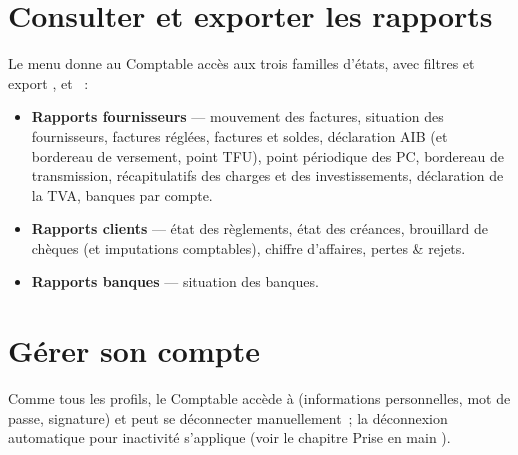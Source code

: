 \section{Consulter et exporter les rapports}

Le menu  donne au Comptable accès aux trois familles d'états, avec filtres et export ,  et ~:

\begin{itemize}
  \item \textbf{Rapports fournisseurs} — mouvement des factures, situation des fournisseurs, factures réglées, factures et soldes, déclaration AIB (et bordereau de versement, point TFU), point périodique des PC, bordereau de transmission, récapitulatifs des charges et des investissements, déclaration de la TVA, banques par compte.
  \item \textbf{Rapports clients} — état des règlements, état des créances, brouillard de chèques (et imputations comptables), chiffre d'affaires, pertes \& rejets.
  \item \textbf{Rapports banques} — situation des banques.
\end{itemize}


\section{Gérer son compte}

Comme tous les profils, le Comptable accède à  (informations personnelles, mot de passe, signature) et peut se déconnecter manuellement~; la déconnexion automatique pour inactivité s'applique (voir le chapitre \og Prise en main \fg{}).

